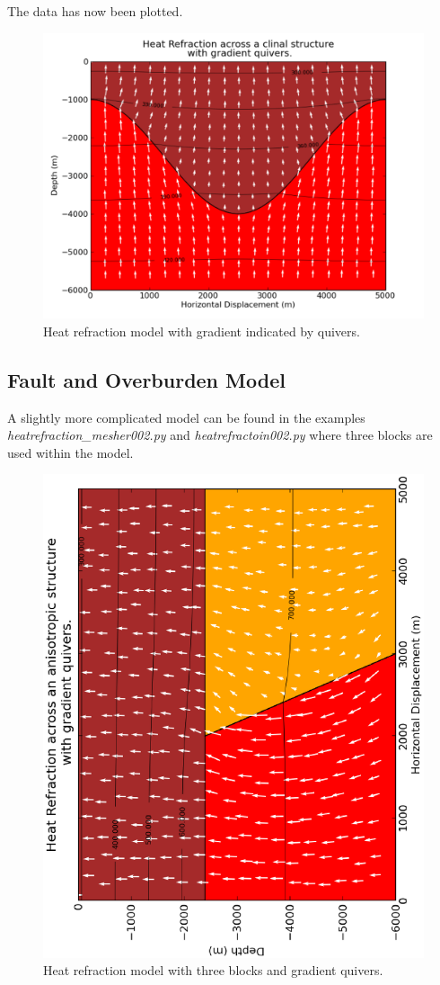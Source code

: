 The data has now been plotted.
\begin{figure}[h]
\centerline{\includegraphics[width=4.in]{figures/heatrefraction001contqu}}
\caption{Heat refraction model with gradient indicated by quivers.}
\label{fig:hr001qumodel}
\end{figure}

\newpage
\subsection{Fault and Overburden Model}
A slightly more complicated model can be found in the examples \textit{heatrefraction_mesher002.py} and \textit{heatrefractoin002.py} where three blocks are used within the model.
\begin{figure}[h]
\centerline{\includegraphics[width=4.in]{figures/heatrefraction002contqu}}
\caption{Heat refraction model with three blocks and gradient quivers.}
\end{figure}

